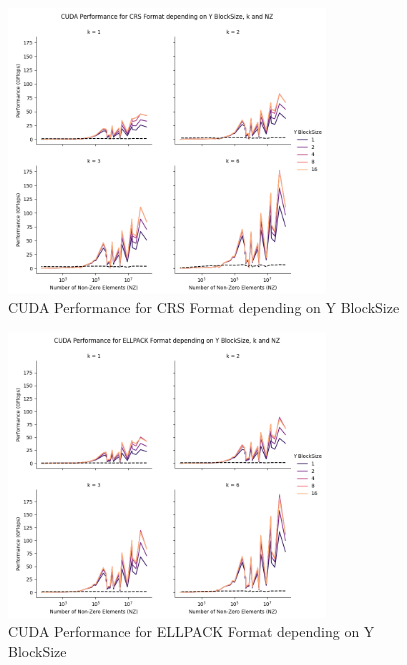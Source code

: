 \documentclass[12pt,oneside]{book} %
\begin{document}
\begin{figure}[H]
    \centering
    \includegraphics[width=0.75\textwidth]{../results/images/CUDA_yBlockSize_CRS.png}
    \caption{CUDA Performance for CRS Format depending on Y BlockSize}
    \label{fig:cudayblocksizecrs}
\end{figure}

\begin{figure}[H]
    \centering
    \includegraphics[width=0.75\textwidth]{../results/images/CUDA_yBlockSize_ELLPACK.png}
    \caption{CUDA Performance for ELLPACK Format depending on Y BlockSize}
    \label{fig:cudayblocksizeellpack}
\end{figure}
\end{document}
